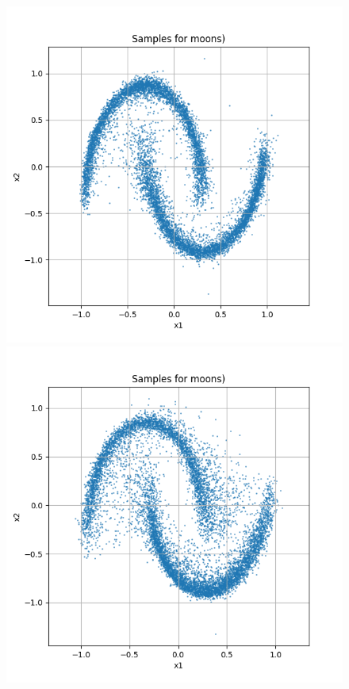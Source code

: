 \documentclass[a4paper,12pt]{article}
\begin{document}
\begin{figure}[h]
  \begin{minipage}{0.3\textwidth}
      \centering
      \includegraphics[width=\linewidth]{"images/Samples for ddpm_2_100_0.0001_0.02_moons.png"}
  \end{minipage}
  \begin{minipage}{0.3\textwidth}
      \centering
      \includegraphics[width=\linewidth]{"images/Samples for ddpm_2_150_0.0001_0.02_moons.png"}

\end{minipage}
\end{figure}
\end{document}

